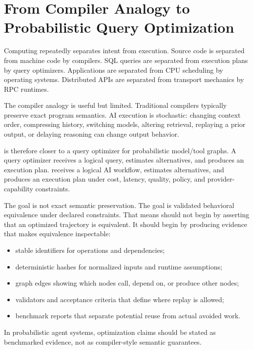 \section{From Compiler Analogy to Probabilistic Query Optimization}

Computing repeatedly separates intent from execution. Source code is separated from machine code by compilers. SQL queries are separated from execution plans by query optimizers. Applications are separated from CPU scheduling by operating systems. Distributed APIs are separated from transport mechanics by RPC runtimes.

The compiler analogy is useful but limited. Traditional compilers typically preserve exact program semantics. AI execution is stochastic: changing context order, compressing history, switching models, altering retrieval, replaying a prior output, or delaying reasoning can change output behavior.

\migaki{} is therefore closer to a query optimizer for probabilistic model/tool graphs. A query optimizer receives a logical query, estimates alternatives, and produces an execution plan. \migaki{} receives a logical AI workflow, estimates alternatives, and produces an execution plan under cost, latency, quality, policy, and provider-capability constraints.

The goal is not exact semantic preservation. The goal is validated behavioral equivalence under declared constraints. That means \migaki{} should not begin by asserting that an optimized trajectory is equivalent. It should begin by producing evidence that makes equivalence inspectable:

\begin{itemize}[leftmargin=1.5em]
  \item stable identifiers for operations and dependencies;
  \item deterministic hashes for normalized inputs and runtime assumptions;
  \item graph edges showing which nodes call, depend on, or produce other nodes;
  \item validators and acceptance criteria that define where replay is allowed;
  \item benchmark reports that separate potential reuse from actual avoided work.
\end{itemize}

\begin{principle}
In probabilistic agent systems, optimization claims should be stated as benchmarked evidence, not as compiler-style semantic guarantees.
\end{principle}
